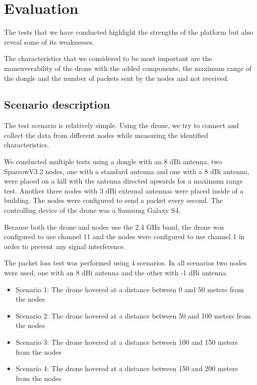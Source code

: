 \normalfont\normalsize
\chapter{Evaluation}

The tests that we have conducted highlight the strengths of the platform but also reveal some of its weaknesses.

The characteristics that we considered to be most important are the maneuverability of the drone with the added components, the maximum range of the dongle and the number of packets sent by the nodes and not received.
 

\section{Scenario description}

The test scenario is relatively simple. Using the drone, we try to connect and collect the data from different nodes while measuring the identified characteristics.

We conducted multiple tests using a dongle with an 8 dBi antenna, two SparrowV3.2 nodes, one with a standard antenna and one with a 8 dBi antenna, were placed on a hill with the antenna directed upwards for a maximum range test. Another three nodes with 3 dBi external antennas were placed inside of a building. The nodes were configured to send a packet every second. The controlling device of the drone was a Samsung Galaxy S4.

Because both the drone and nodes use the 2.4 GHz band, the drone was configured to use channel 11 and the nodes were configured to use channel 1 in order to prevent any signal interference.

The packet loss test was performed using 4 scenarios. In all scenarios two nodes were used, one with an 8 dBi antenna and the other with -1 dBi antenna. 
 
\begin{itemize}

\item Scenario 1: The drone hovered at a distance between 0 and 50 meters from the nodes
\item Scenario 2: The drone hovered at a distance between 50 and 100 meters from the nodes
\item Scenario 3: The drone hovered at a distance between 100 and 150 meters from the nodes
\item Scenario 4: The drone hovered at a distance between 150 and 200 meters from the nodes

\end{itemize}



